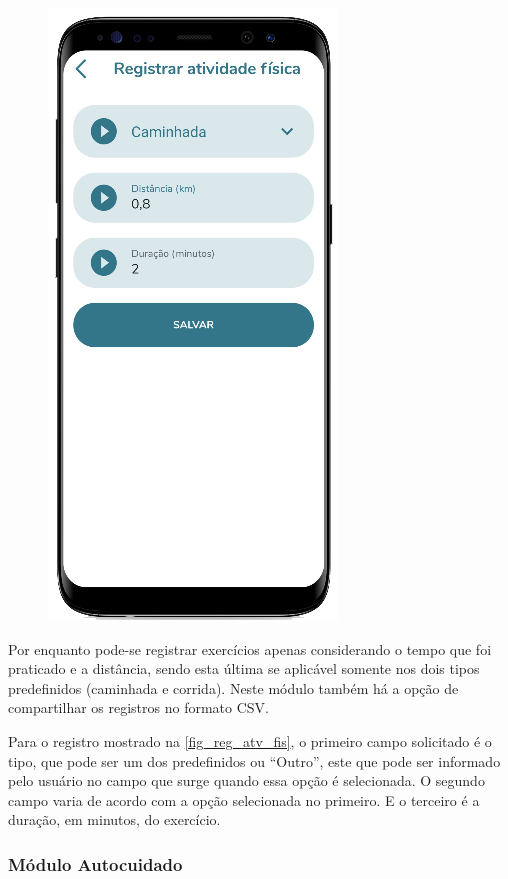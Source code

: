 \begin{figure}[htb]
\begin{minipage}{0.45\textwidth}
        \includegraphics[scale=0.66]{Imagens/desenvolvimento/app/reg_atv_fis.png}
    \end{minipage}
\end{figure}

Por enquanto pode-se registrar exercícios apenas considerando o tempo que foi praticado e a distância, sendo
esta última se aplicável somente nos dois tipos predefinidos (caminhada e corrida). Neste módulo também há a
opção de compartilhar os registros no formato CSV\@.

Para o registro mostrado na \autoref{fig_reg_atv_fis}, o primeiro campo solicitado é o tipo, que pode ser um
dos predefinidos ou “Outro”, este que pode ser informado pelo usuário no campo que surge quando essa opção é
selecionada. O segundo campo varia de acordo com a opção selecionada no primeiro. E o terceiro é a duração,
em minutos, do exercício.

\subsubsection{Módulo Autocuidado}

